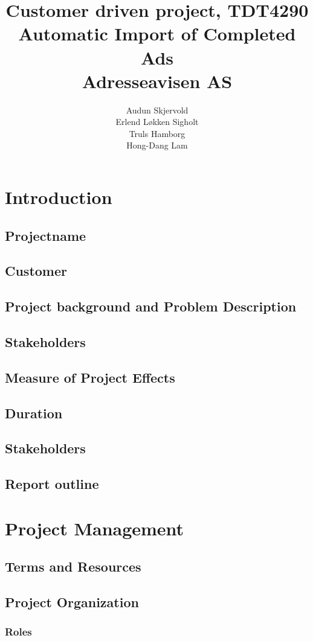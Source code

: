 \documentclass[12pt, a4paper]{article}
\title{\normalsize Customer driven project, TDT4290 \\ \LARGE \textbf{Automatic Import of Completed Ads} \normalsize \\Adresseavisen AS}
\author{Audun Skjervold \\ Erlend Løkken Sigholt \\ Truls Hamborg \\ Hong-Dang Lam}
\begin{document}
\maketitle 
\newpage
\tableofcontents
\newpage
 
\section{Introduction}
\subsection{Projectname}
\subsection{Customer}
\subsection{Project background and Problem Description}
\subsection{Stakeholders}
\subsection{Measure of Project Effects}
\subsection{Duration}\subsection{Stakeholders}
\subsection{Report outline}

\section{Project Management}
\subsection{Terms and Resources}
\subsection{Project Organization}
\subsubsection{Roles}
\end{document}
